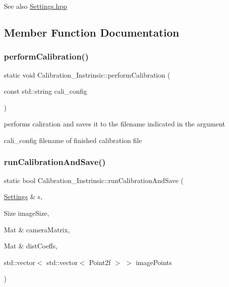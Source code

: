\begin{DoxySeeAlso}{See also}
\mbox{\hyperlink{_settings_8hpp_source}{Settings.\+hpp}} 
\end{DoxySeeAlso}


\subsection{Member Function Documentation}
\mbox{\label{class_calibration___instrinsic_a65d585bbfe48d2c1cedbc0f1b43b05d5}} 
\subsubsection{\texorpdfstring{perform\+Calibration()}{performCalibration()}}
{\footnotesize\ttfamily static void Calibration\+\_\+\+Instrinsic\+::perform\+Calibration (\begin{DoxyParamCaption}\item[{const std\+::string}]{cali\+\_\+config }\end{DoxyParamCaption})\hspace{0.3cm}{\ttfamily [static]}}

performs caliration and saves it to the filename indicated in the argument \begin{DoxyItemize}
\item cali\+\_\+config filename of finished calibration file \end{DoxyItemize}
\mbox{\label{class_calibration___instrinsic_aa8de03a03a709d52c9ac4e076e99072e}} 
\subsubsection{\texorpdfstring{run\+Calibration\+And\+Save()}{runCalibrationAndSave()}}
{\footnotesize\ttfamily static bool Calibration\+\_\+\+Instrinsic\+::run\+Calibration\+And\+Save (\begin{DoxyParamCaption}\item[{\mbox{\hyperlink{class_settings}{Settings}} \&}]{s,  }\item[{Size}]{image\+Size,  }\item[{Mat \&}]{camera\+Matrix,  }\item[{Mat \&}]{dist\+Coeffs,  }\item[{std\+::vector$<$ std\+::vector$<$ Point2f $>$ $>$}]{image\+Points }\end{DoxyParamCaption})\hspace{0.3cm}{\ttfamily [static]}}


